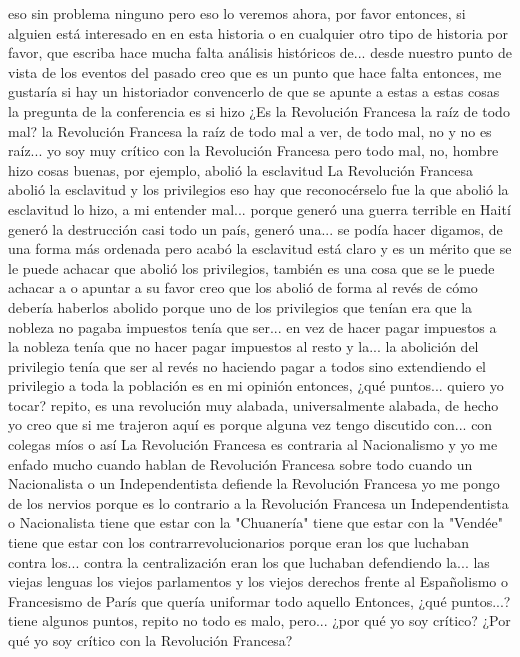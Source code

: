 eso sin problema ninguno pero eso lo veremos ahora, por favor entonces, si alguien está interesado en
en esta historia o en cualquier otro tipo de historia por favor, que escriba hace mucha falta análisis históricos de...
desde nuestro punto de vista de los eventos del pasado creo que es un punto que hace falta entonces, me gustaría si hay un historiador
convencerlo de que se apunte a estas a estas cosas la pregunta de la conferencia es si hizo
¿Es la Revolución Francesa la raíz de todo mal?
la Revolución Francesa la raíz de todo mal a ver, de todo mal, no y no es raíz...
yo soy muy crítico con la Revolución Francesa pero todo mal, no, hombre hizo cosas buenas, por ejemplo, abolió la esclavitud
La Revolución Francesa abolió la esclavitud y los privilegios
eso hay que reconocérselo fue la que abolió la esclavitud lo hizo, a mi entender
mal... porque generó una guerra terrible en Haití generó la destrucción casi todo un país, generó una...
se podía hacer digamos, de una forma más ordenada pero acabó la esclavitud está claro y es un mérito que se le puede achacar
que abolió los privilegios, también es una cosa que se le puede achacar a o apuntar a su favor
creo que los abolió de forma al revés de cómo debería haberlos abolido porque uno de los privilegios que tenían era que la nobleza
no pagaba impuestos tenía que ser... en vez de hacer pagar impuestos a la nobleza tenía que no hacer pagar impuestos al resto
y la... la abolición del privilegio tenía que ser al revés no haciendo pagar a todos sino extendiendo el privilegio a toda la población
es en mi opinión entonces, ¿qué puntos...
quiero yo tocar? repito, es una revolución muy alabada, universalmente alabada, de hecho
yo creo que si me trajeron aquí es porque alguna vez tengo discutido con... con colegas míos o así
La Revolución Francesa es contraria al Nacionalismo
y yo me enfado mucho cuando hablan de Revolución Francesa sobre todo cuando un Nacionalista o un Independentista defiende la Revolución Francesa
yo me pongo de los nervios porque es lo contrario a la Revolución Francesa un Independentista o Nacionalista tiene que estar con la "Chuanería"
tiene que estar con la "Vendée" tiene que estar con los contrarrevolucionarios porque eran los que luchaban contra los... contra la centralización
eran los que luchaban defendiendo la... las viejas lenguas los viejos parlamentos y los viejos derechos
frente al Españolismo o Francesismo de París que quería uniformar todo aquello
Entonces, ¿qué puntos...? tiene algunos puntos, repito no todo es malo, pero... ¿por qué yo soy crítico?
¿Por qué yo soy crítico con la Revolución Francesa?
